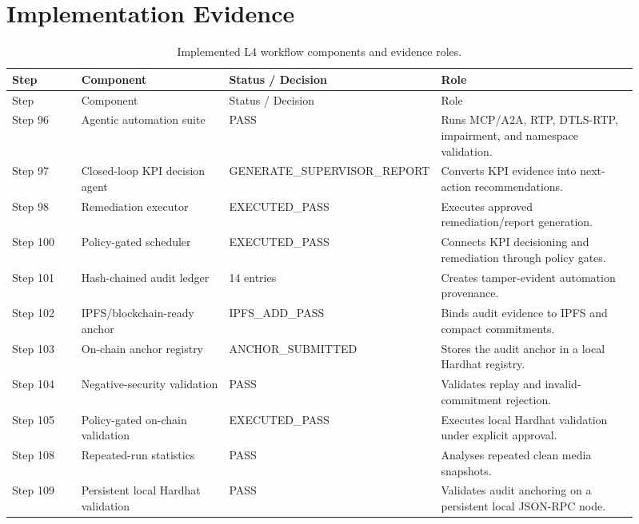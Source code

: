 \documentclass[10pt]{article}
\begin{document}
\section{Implementation Evidence}
\begin{longtable}{p{0.12\linewidth} p{0.25\linewidth} p{0.20\linewidth} p{0.34\linewidth}}
\caption{Implemented L4 workflow components and evidence roles.}\\
\toprule
Step & Component & Status / Decision & Role \\
\midrule
\endfirsthead
\toprule
Step & Component & Status / Decision & Role \\
\midrule
\endhead
Step 96 & Agentic automation suite & PASS & Runs MCP/A2A, RTP, DTLS-RTP, impairment, and namespace validation. \\
Step 97 & Closed-loop KPI decision agent & GENERATE\_SUPERVISOR\_REPORT & Converts KPI evidence into next-action recommendations. \\
Step 98 & Remediation executor & EXECUTED\_PASS & Executes approved remediation/report generation. \\
Step 100 & Policy-gated scheduler & EXECUTED\_PASS & Connects KPI decisioning and remediation through policy gates. \\
Step 101 & Hash-chained audit ledger & 14 entries & Creates tamper-evident automation provenance. \\
Step 102 & IPFS/blockchain-ready anchor & IPFS\_ADD\_PASS & Binds audit evidence to IPFS and compact commitments. \\
Step 103 & On-chain anchor registry & ANCHOR\_SUBMITTED & Stores the audit anchor in a local Hardhat registry. \\
Step 104 & Negative-security validation & PASS & Validates replay and invalid-commitment rejection. \\
Step 105 & Policy-gated on-chain validation & EXECUTED\_PASS & Executes local Hardhat validation under explicit approval. \\
Step 108 & Repeated-run statistics & PASS & Analyses repeated clean media snapshots. \\
Step 109 & Persistent local Hardhat validation & PASS & Validates audit anchoring on a persistent local JSON-RPC node. \\
\bottomrule
\end{longtable}
\end{document}
